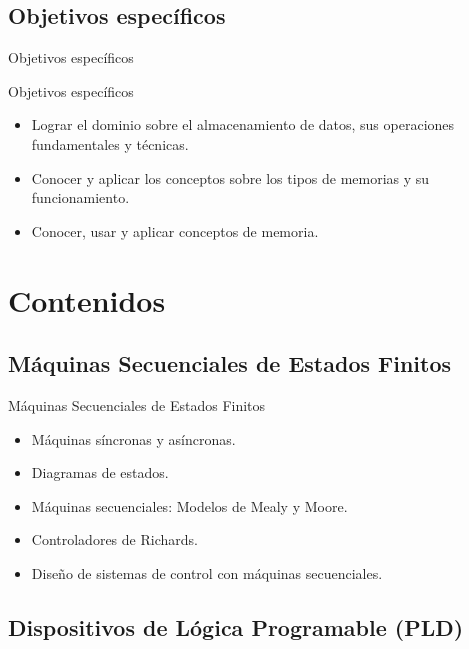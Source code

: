 \documentclass[handout,xcolor=dvipsnames]{beamer}
\newcommand{\pageframe}[1]{\frame{\begin{center}{ \Huge #1 }\end{center}}}
\begin{document}
\subsection{Objetivos específicos}

\begin{frame}{Objetivos específicos}
  \begin{block}{Objetivos específicos}
    \begin{itemize}
      \item<1> Lograr el dominio sobre el almacenamiento de datos, sus operaciones fundamentales y técnicas.
      \item<1> Conocer y aplicar los conceptos sobre los tipos de memorias y su funcionamiento.
      \item<1> Conocer, usar y aplicar conceptos de memoria.
    \end{itemize}
  \end{block}
\end{frame}


\section{Contenidos}

\pageframe{Contenidos}

\subsection[Máquinas]{Máquinas Secuenciales de Estados Finitos}

\begin{frame}{Máquinas Secuenciales de Estados Finitos}
  \begin{block}{}
  \begin{itemize}
    \item Máquinas síncronas y asíncronas.
    \item Diagramas de estados.
    \item Máquinas secuenciales: Modelos de Mealy y Moore.
    \item Controladores de Richards.
    \item Diseño de sistemas de control con máquinas secuenciales.
  \end{itemize}
  \end{block}
\end{frame}

\subsection[PLD]{Dispositivos de Lógica Programable (PLD)}
\end{document}
